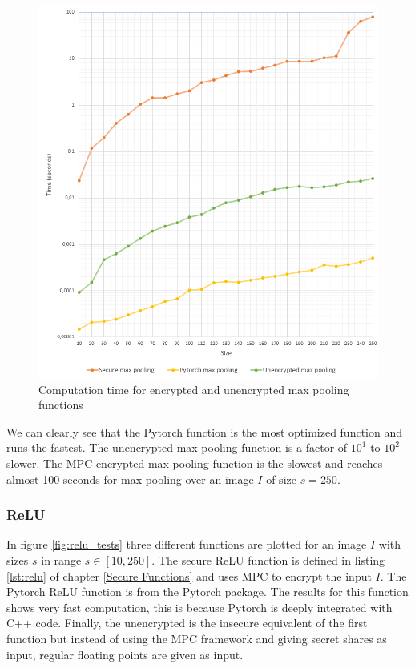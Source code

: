 \begin{figure}[H]
  \includegraphics[scale=0.7]{fig/maxpooling_test.png}
  \centering
  \caption{Computation time for encrypted and unencrypted max pooling functions}
  \label{fig:maxpooling_test}
\end{figure}

We can clearly see that the Pytorch function is the most optimized function and runs the fastest. The unencrypted max pooling function is a factor of $10^1$ to $10^2$ slower. The MPC encrypted max pooling function is the slowest and reaches almost 100 seconds for max pooling over an image $I$ of size $s = 250$.

\subsubsection{ReLU}
In figure \ref{fig:relu_tests} three different functions are plotted for an image $I$ with sizes $s$ in range $s \in [10,250]$. The secure ReLU function is defined in listing \ref{lst:relu} of chapter \ref{Secure Functions} and uses MPC to encrypt the input $I$. The Pytorch ReLU function is  from the Pytorch package. The results for this function shows very fast computation, this is because Pytorch is deeply integrated with C++ code. Finally, the unencrypted is the insecure equivalent of the first function but instead of using the MPC framework and giving secret shares as input, regular floating points are given as input.

